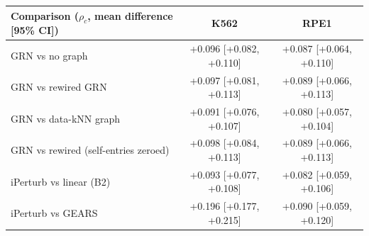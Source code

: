 \begin{tabular}{lcc}
\toprule
Comparison ($\rho_c$, mean difference [95\% CI]) & K562 & RPE1\\\midrule
\quad GRN vs no graph & +0.096 [+0.082, +0.110] & +0.087 [+0.064, +0.110]\\
\quad GRN vs rewired GRN & +0.097 [+0.081, +0.113] & +0.089 [+0.066, +0.113]\\
\quad GRN vs data-kNN graph & +0.091 [+0.076, +0.107] & +0.080 [+0.057, +0.104]\\
\quad GRN vs rewired (self-entries zeroed) & +0.098 [+0.084, +0.113] & +0.089 [+0.066, +0.113]\\
\quad iPerturb vs linear (B2) & +0.093 [+0.077, +0.108] & +0.082 [+0.059, +0.106]\\
\quad iPerturb vs GEARS & +0.196 [+0.177, +0.215] & +0.090 [+0.059, +0.120]\\
\bottomrule
\end{tabular}